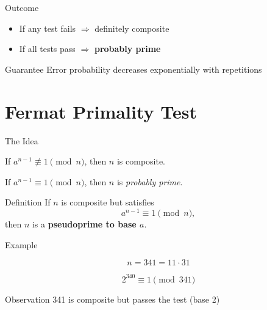 \documentclass{beamer}
\newcommand{\bld}[1]{\textbf{#1}}
\newcommand{\itl}[1]{\textit{#1}}
\begin{document}
\begin{frame}{Outcome}

\begin{itemize}
    \item If any test fails $\Rightarrow$ definitely composite
    \item If all tests pass $\Rightarrow$ \bld{probably prime}
\end{itemize}

\vspace{1em}

\begin{block}{Guarantee}
Error probability decreases exponentially with repetitions
\end{block}

\end{frame}
\section{Fermat Primality Test}

\begin{frame}{The Idea}

If $a^{n-1} \not\equiv 1 \pmod{n}$, then $n$ is composite.

\vspace{1em}

If $a^{n-1} \equiv 1 \pmod{n}$, then $n$ is \itl{probably prime}.

\vspace{1em}

\begin{block}{Definition}
If $n$ is composite but satisfies
\[
a^{n-1} \equiv 1 \pmod{n},
\]
then $n$ is a \bld{pseudoprime to base $a$}.
\end{block}

\end{frame}


\begin{frame}{Example}

\[
n = 341 = 11 \cdot 31
\]

\[
2^{340} \equiv 1 \pmod{341}
\]

\vspace{1em}

\begin{block}{Observation}
341 is composite but passes the test (base 2)
\end{block}

\end{frame}
\end{document}
